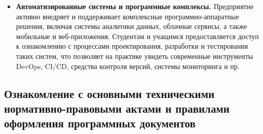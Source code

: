 \begin{itemize}
    \item \textbf{Автоматизированные системы и программные комплексы.}
    Предприятие активно внедряет и поддерживает комплексные программно-аппаратные решения, включая системы аналитики данных, облачные сервисы, а также мобильные и веб-приложения. Студентам и учащимся предоставляется доступ к ознакомлению с процессами проектирования, разработки и тестирования таких систем, что позволяет на практике увидеть современные инструменты DevOps, CI/CD, средства контроля версий, системы мониторинга и пр.
\end{itemize}

\subsection{Ознакомление с основными техническими нормативно-правовыми актами и правилами оформления программных документов}
\label{subsec:practice:tnpa_doc_rules}

